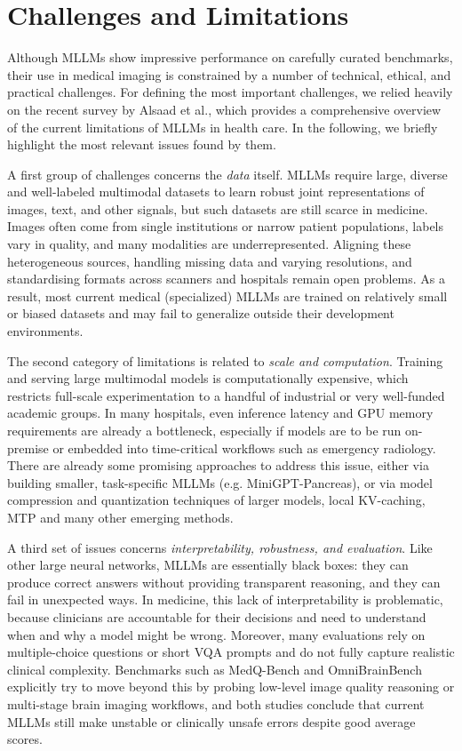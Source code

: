 \documentclass{imc-inf}
\begin{document}
\chapter{Challenges and Limitations}\label{chap:challenges}

Although MLLMs show impressive performance on carefully curated benchmarks, their use in medical imaging is constrained by a number of technical, ethical, and practical challenges.
For defining the most important challenges, we relied heavily on the recent survey by Alsaad et al., which provides a comprehensive overview of the current limitations of MLLMs in health care.\cite{alsaad2024multimodal}
In the following, we briefly highlight the most relevant issues found by them.

A first group of challenges concerns the \emph{data} itself.
MLLMs require large, diverse and well-labeled multimodal datasets to learn robust joint representations of images, text, and other signals, but such datasets are still scarce in medicine.\cite{alsaad2024multimodal}
Images often come from single institutions or narrow patient populations, labels vary in quality, and many modalities are underrepresented.
Aligning these heterogeneous sources, handling missing data and varying resolutions, and standardising formats across scanners and hospitals remain open problems.
As a result, most current medical (specialized) MLLMs are trained on relatively small or biased datasets and may fail to generalize outside their development environments.

The second category of limitations is related to \emph{scale and computation}.
Training and serving large multimodal models is computationally expensive, which restricts full-scale experimentation to a handful of industrial or very well-funded academic groups.\cite{alsaad2024multimodal}
In many hospitals, even inference latency and GPU memory requirements are already a bottleneck, especially if models are to be run on-premise or embedded into time-critical workflows such as emergency radiology.
There are already some promising approaches to address this issue, either via building smaller, task-specific MLLMs (e.g. MiniGPT-Pancreas\cite{moglia2026minigpt}), or via model compression and quantization techniques of larger models, local KV-caching, MTP and many other emerging methods.

A third set of issues concerns \emph{interpretability, robustness, and evaluation}.
Like other large neural networks, MLLMs are essentially black boxes: they can produce correct answers without providing transparent reasoning, and they can fail in unexpected ways.\cite{alsaad2024multimodal}
In medicine, this lack of interpretability is problematic, because clinicians are accountable for their decisions and need to understand when and why a model might be wrong.
Moreover, many evaluations rely on multiple-choice questions or short VQA prompts and do not fully capture realistic clinical complexity.
Benchmarks such as MedQ-Bench and OmniBrainBench explicitly try to move beyond this by probing low-level image quality reasoning or multi-stage brain imaging workflows, and both studies conclude that current MLLMs still make unstable or clinically unsafe errors despite good average scores.\cite{liu2025medq,peng2026omnibrainbench}
\end{document}
